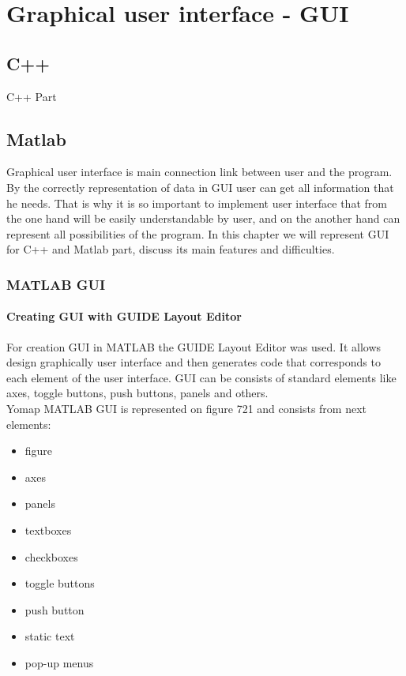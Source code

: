 
\chapter{Graphical user interface - GUI} %

\label{Chapter7} %



\section{C++}
	C++ Part
\section{Matlab}
	Graphical user interface is main connection link between user and the program. By the correctly representation of data in GUI user can get all information that he needs. That is why it is so important to implement user interface that from the one hand will be easily understandable by user, and on the another hand can represent all possibilities of the program. In this chapter we will represent GUI for C++ and Matlab part, discuss its main features and difficulties.
	
	\subsection{MATLAB GUI}
	
		\subsubsection{Creating GUI with GUIDE Layout Editor}
			For creation GUI in MATLAB the GUIDE Layout Editor was used. It allows design graphically user interface and then generates code that corresponds to each element of the user interface. GUI can be consists of standard elements like axes, toggle buttons, push buttons, panels and others.\\
			
			Yomap MATLAB GUI is represented on figure 721 and consists from next elements:
			\begin{itemize}
				\item figure
				\item axes
				\item panels
				\item textboxes
				\item checkboxes
				\item toggle buttons
				\item push button
				\item static text
				\item pop-up menus
			\end{itemize}
			
